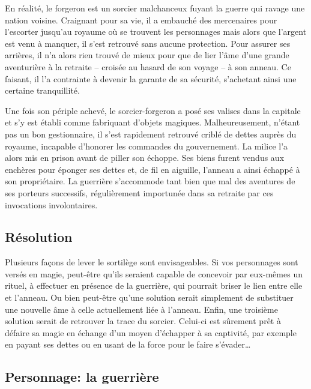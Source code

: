 En réalité, le forgeron est un sorcier malchanceux fuyant la guerre qui ravage une nation voisine.
Craignant pour sa vie, il a embauché des mercenaires pour l'escorter jusqu'au royaume où se trouvent les personnages mais alors que l'argent est venu à manquer, il s'est retrouvé sans aucune protection.
Pour assurer ses arrières, il n'a alors rien trouvé de mieux pour que de lier l'âme d'une grande aventurière à la retraite -- croisée au hasard de son voyage -- à son anneau.
Ce faisant, il l'a contrainte à devenir la garante de sa sécurité, s'achetant ainsi une certaine tranquillité.

Une fois son périple achevé, le sorcier-forgeron a posé ses valises dans la capitale et s'y est établi comme fabriquant d'objets magiques.
Malheureusement, n'étant pas un bon gestionnaire, il s'est rapidement retrouvé criblé de dettes auprès du royaume, incapable d'honorer les commandes du gouvernement.
La milice l'a alors mis en prison avant de piller son échoppe.
Ses biens furent vendus aux enchères pour éponger ses dettes et, de fil en aiguille, l'anneau a ainsi échappé à son propriétaire.
La guerrière s'accommode tant bien que mal des aventures de ses porteurs successifs, régulièrement importunée dans sa retraite par ces invocations involontaires.

\subsection*{Résolution}

Plusieurs façons de lever le sortilège sont envisageables.
Si vos personnages sont versés en magie, peut-être qu'ils seraient capable de concevoir par eux-mêmes un rituel, à effectuer en présence de la guerrière, qui pourrait briser le lien entre elle et l'anneau.
Ou bien peut-être qu'une solution serait simplement de substituer une nouvelle âme à celle actuellement liée à l'anneau.
Enfin, une troisième solution serait de retrouver la trace du sorcier.
Celui-ci est sûrement prêt à défaire sa magie en échange d'un moyen d'échapper à sa captivité, par exemple en payant ses dettes ou en usant de la force pour le faire s'évader\dots

\subsection*{Personnage: la guerrière}

\newcommand\descriptionperso[5]{%
	\begin{tcolorbox}[colback=black!1!white]
	\begin{tabular}{lcl}
		{\overlock\textbf{Caractère}} & : & #1\\
		{\overlock\textbf{Force}} & : & #2\\
		{\overlock\textbf{Faiblesse}} & : & #3\\
		{\overlock\textbf{Objectif}} & : & #4\\
	\end{tabular}

	\medskip
	#5
	\end{tcolorbox}
}%

